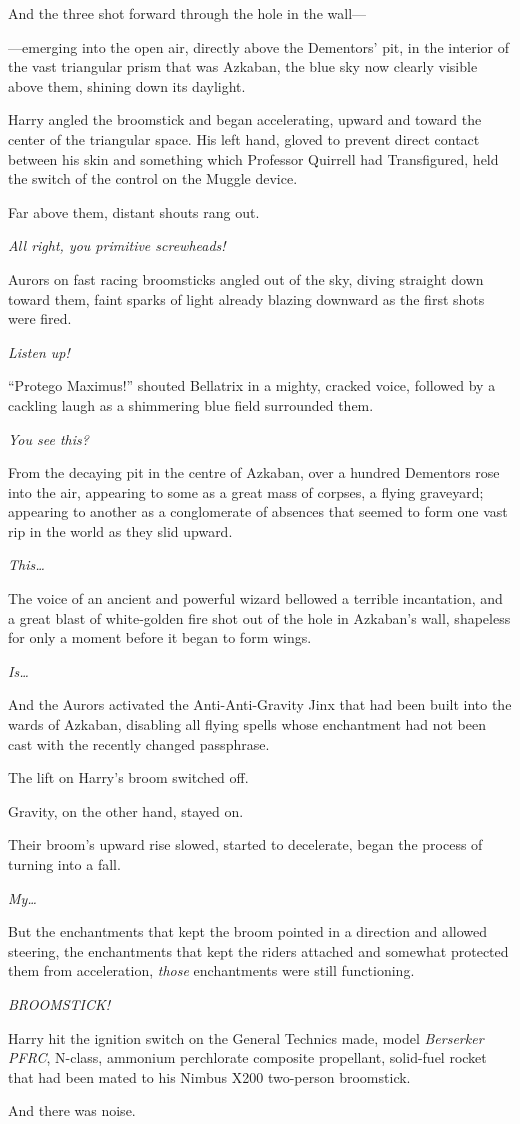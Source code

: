 And the three shot forward through the hole in the wall---

---emerging into the open air, directly above the Dementors' pit, in the
interior of the vast triangular prism that was Azkaban, the blue sky now
clearly visible above them, shining down its daylight.

Harry angled the broomstick and began accelerating, upward and toward
the center of the triangular space. His left hand, gloved to prevent
direct contact between his skin and something which Professor Quirrell
had Transfigured, held the switch of the control on the Muggle device.

Far above them, distant shouts rang out.

\emph{All right, you primitive screwheads!}

Aurors on fast racing broomsticks angled out of the sky, diving straight
down toward them, faint sparks of light already blazing downward as the
first shots were fired.

\emph{Listen up!}

``Protego Maximus!'' shouted Bellatrix in a mighty, cracked voice,
followed by a cackling laugh as a shimmering blue field surrounded them.

\emph{You see this?}

From the decaying pit in the centre of Azkaban, over a hundred Dementors
rose into the air, appearing to some as a great mass of corpses, a
flying graveyard; appearing to another as a conglomerate of absences
that seemed to form one vast rip in the world as they slid upward.

\emph{This\ldots{}}

The voice of an ancient and powerful wizard bellowed a terrible
incantation, and a great blast of white-golden fire shot out of the hole
in Azkaban's wall, shapeless for only a moment before it began to form
wings.

\emph{Is\ldots{}}

And the Aurors activated the Anti-Anti-Gravity Jinx that had been built
into the wards of Azkaban, disabling all flying spells whose enchantment
had not been cast with the recently changed passphrase.

The lift on Harry's broom switched off.

Gravity, on the other hand, stayed on.

Their broom's upward rise slowed, started to decelerate, began the
process of turning into a fall.

\emph{My\ldots{}}

But the enchantments that kept the broom pointed in a direction and
allowed steering, the enchantments that kept the riders attached and
somewhat protected them from acceleration, \emph{those} enchantments
were still functioning.

\emph{BROOMSTICK!}

Harry hit the ignition switch on the General Technics made, model
\emph{Berserker PFRC}, N-class, ammonium perchlorate composite
propellant, solid-fuel rocket that had been mated to his Nimbus X200
two-person broomstick.

And there was noise.
